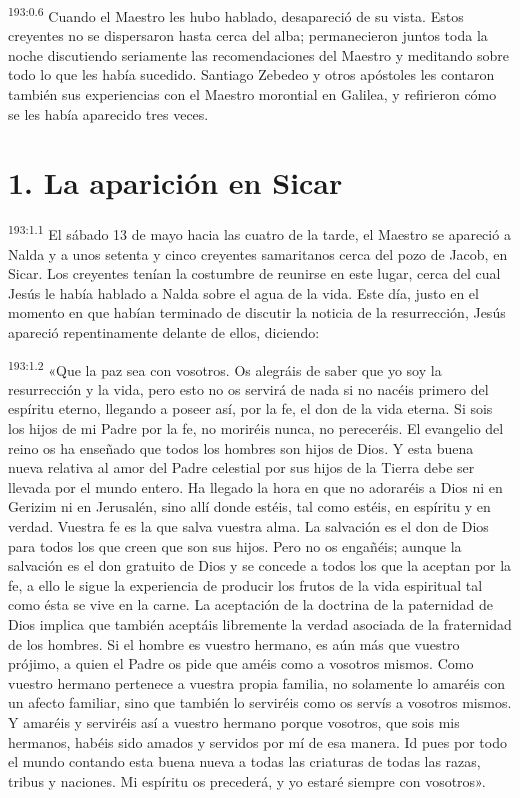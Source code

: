 \par 
\textsuperscript{193:0.6} Cuando el Maestro les hubo hablado, desapareció de su vista. Estos creyentes no se dispersaron hasta cerca del alba; permanecieron juntos toda la noche discutiendo seriamente las recomendaciones del Maestro y meditando sobre todo lo que les había sucedido. Santiago Zebedeo y otros apóstoles les contaron también sus experiencias con el Maestro morontial en Galilea, y refirieron cómo se les había aparecido tres veces.

\section*{1. La aparición en Sicar}
\par 
\textsuperscript{193:1.1} El sábado 13 de mayo hacia las cuatro de la tarde, el Maestro se apareció a Nalda y a unos setenta y cinco creyentes samaritanos cerca del pozo de Jacob, en Sicar. Los creyentes tenían la costumbre de reunirse en este lugar, cerca del cual Jesús le había hablado a Nalda sobre el agua de la vida. Este día, justo en el momento en que habían terminado de discutir la noticia de la resurrección, Jesús apareció repentinamente delante de ellos, diciendo:

\par 
\textsuperscript{193:1.2} «Que la paz sea con vosotros. Os alegráis de saber que yo soy la resurrección y la vida, pero esto no os servirá de nada si no nacéis primero del espíritu eterno, llegando a poseer así, por la fe, el don de la vida eterna. Si sois los hijos de mi Padre por la fe, no moriréis nunca, no pereceréis. El evangelio del reino os ha enseñado que todos los hombres son hijos de Dios. Y esta buena nueva relativa al amor del Padre celestial por sus hijos de la Tierra debe ser llevada por el mundo entero. Ha llegado la hora en que no adoraréis a Dios ni en Gerizim ni en Jerusalén, sino allí donde estéis, tal como estéis, en espíritu y en verdad. Vuestra fe es la que salva vuestra alma. La salvación es el don de Dios para todos los que creen que son sus hijos. Pero no os engañéis; aunque la salvación es el don gratuito de Dios y se concede a todos los que la aceptan por la fe, a ello le sigue la experiencia de producir los frutos de la vida espiritual tal como ésta se vive en la carne. La aceptación de la doctrina de la paternidad de Dios implica que también aceptáis libremente la verdad asociada de la fraternidad de los hombres. Si el hombre es vuestro hermano, es aún más que vuestro prójimo, a quien el Padre os pide que améis como a vosotros mismos. Como vuestro hermano pertenece a vuestra propia familia, no solamente lo amaréis con un afecto familiar, sino que también lo serviréis como os servís a vosotros mismos. Y amaréis y serviréis así a vuestro hermano porque vosotros, que sois mis hermanos, habéis sido amados y servidos por mí de esa manera. Id pues por todo el mundo contando esta buena nueva a todas las criaturas de todas las razas, tribus y naciones. Mi espíritu os precederá, y yo estaré siempre con vosotros».

